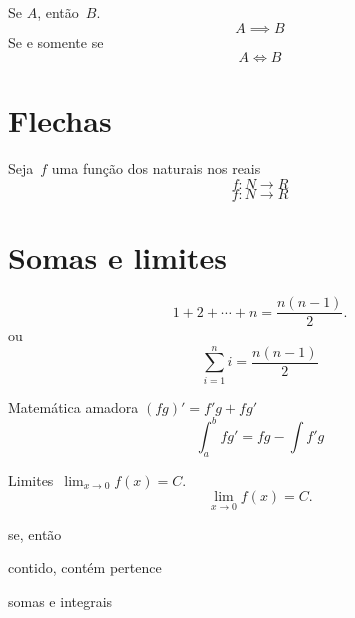 Se \(A\), então~\(B\).
\[
A \implies B
\]
Se e somente se
\[
A \iff B
\]

\chapter{Flechas}

Seja~\(f\) uma função dos naturais nos reais
\[
f\colon N \to R
\]
\[
f: N \to R
\]

\chapter{Somas e limites}

\[
1+2+\cdots + n = \frac{n(n-1)}{2}.
\]
ou
\[
\sum_{i=1}^n i = \frac{n(n-1)}{2}
\]

Matemática amadora \((fg)' = f'g + fg'\)
\[
\int_a^b fg' = fg - \int f'g
\]

Limites~\(\lim_{x\to 0} f(x) = C\).
\[
\lim_{x\to 0} f(x) = C.
\]




se, então

contido, contém
pertence

somas e integrais







